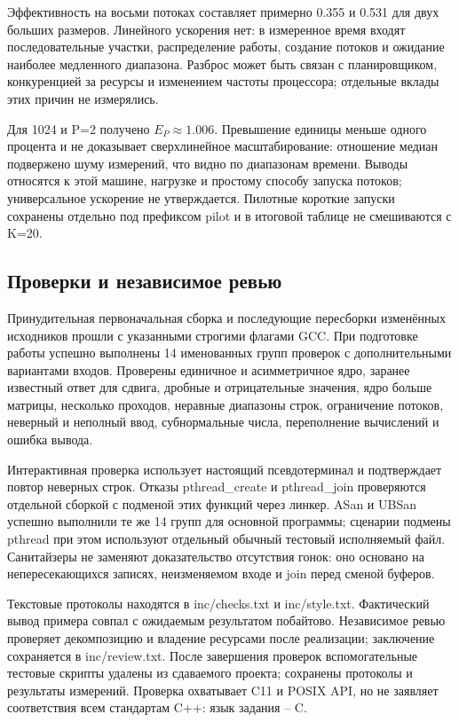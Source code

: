 \documentclass[12pt,a4paper]{article}
\begin{document}
Эффективность на восьми потоках составляет примерно 0.355 и 0.531 для двух больших размеров. Линейного ускорения нет: в измеренное время входят последовательные участки, распределение работы, создание потоков и ожидание наиболее медленного диапазона. Разброс может быть связан с планировщиком, конкуренцией за ресурсы и изменением частоты процессора; отдельные вклады этих причин не измерялись.

Для 1024 и P=2 получено $E_P\approx1.006$. Превышение единицы меньше одного процента и не доказывает сверхлинейное масштабирование: отношение медиан подвержено шуму измерений, что видно по диапазонам времени. Выводы относятся к этой машине, нагрузке и простому способу запуска потоков; универсальное ускорение не утверждается. Пилотные короткие запуски сохранены отдельно под префиксом pilot и в итоговой таблице не смешиваются с K=20.

\subsection{Проверки и независимое ревью}

Принудительная первоначальная сборка и последующие пересборки изменённых исходников прошли с указанными строгими флагами GCC. При подготовке работы успешно выполнены 14 именованных групп проверок с дополнительными вариантами входов. Проверены единичное и асимметричное ядро, заранее известный ответ для сдвига, дробные и отрицательные значения, ядро больше матрицы, несколько проходов, неравные диапазоны строк, ограничение потоков, неверный и неполный ввод, субнормальные числа, переполнение вычислений и ошибка вывода.

Интерактивная проверка использует настоящий псевдотерминал и подтверждает повтор неверных строк. Отказы pthread\_create и pthread\_join проверяются отдельной сборкой с подменой этих функций через линкер. ASan и UBSan успешно выполнили те же 14 групп для основной программы; сценарии подмены pthread при этом используют отдельный обычный тестовый исполняемый файл. Санитайзеры не заменяют доказательство отсутствия гонок: оно основано на непересекающихся записях, неизменяемом входе и join перед сменой буферов.

Текстовые протоколы находятся в inc/checks.txt и inc/style.txt. Фактический вывод примера совпал с ожидаемым результатом побайтово. Независимое ревью проверяет декомпозицию и владение ресурсами после реализации; заключение сохраняется в inc/review.txt. После завершения проверок вспомогательные тестовые скрипты удалены из сдаваемого проекта; сохранены протоколы и результаты измерений. Проверка охватывает C11 и POSIX API, но не заявляет соответствия всем стандартам C++: язык задания -- C.
\end{document}
